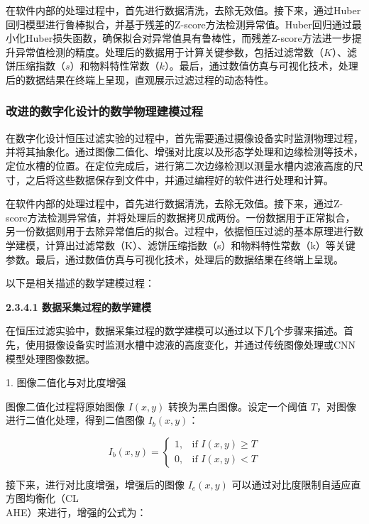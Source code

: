 \documentclass[UTF8,a4paper,fontset=none]{ctexart}
\newcommand{\wuhao}{\fontsize{10.5pt}{15pt}\selectfont}       %
\begin{document}
在软件内部的处理过程中，首先进行数据清洗，去除无效值。接下来，通过Huber回归模型进行鲁棒拟合，并基于残差的Z-score方法检测异常值。Huber回归通过最小化Huber损失函数，确保拟合对异常值具有鲁棒性，而残差Z-score方法进一步提升异常值检测的精度。处理后的数据用于计算关键参数，包括过滤常数（\(K\)）、滤饼压缩指数（\(s\)）和物料特性常数（\(k\)）。最后，通过数值仿真与可视化技术，处理后的数据结果在终端上呈现，直观展示过滤过程的动态特性。

\subsubsection{改进的数字化设计的数学物理建模过程}


在数字化设计恒压过滤实验的过程中，首先需要通过摄像设备实时监测物理过程，并将其抽象化。通过图像二值化、增强对比度以及形态学处理和边缘检测等技术，定位水槽的位置。在定位完成后，进行第二次边缘检测以测量水槽内滤液高度的尺寸，之后将这些数据保存到文件中，并通过编程好的软件进行处理和计算。

在软件内部的处理过程中，首先进行数据清洗，去除无效值。接下来，通过Z-score方法检测异常值，并将处理后的数据拷贝成两份。一份数据用于正常拟合，另一份数据则用于去除异常值后的拟合。过程中，依据恒压过滤的基本原理进行数学建模，计算出过滤常数（K）、滤饼压缩指数（s）和物料特性常数（k）等关键参数。最后，通过数值仿真与可视化技术，处理后的数据结果在终端上呈现。

以下是相关描述的数学建模过程：

{\noindent \wuhao \rmfamily {} \textbf{2.3.4.1 \quad 数据采集过程的数学建模}}

在恒压过滤实验中，数据采集过程的数学建模可以通过以下几个步骤来描述。首先，使用摄像设备实时监测水槽中滤液的高度变化，并通过传统图像处理或CNN模型处理图像数据。

1. 图像二值化与对比度增强

图像二值化过程将原始图像 \( I(x, y) \) 转换为黑白图像。设定一个阈值 \( T \)，对图像进行二值化处理，得到二值图像 \( I_b(x, y) \)：

\begin{equation}
I_b(x, y) = 
\begin{cases} 
1, & \text{if } I(x, y) \geq T \\
0, & \text{if } I(x, y) < T
\end{cases}
\end{equation}

接下来，进行对比度增强，增强后的图像 \( I_e(x, y) \) 可以通过对比度限制自适应直方图均衡化\textsuperscript{\cite{ref15,ref18}}（CL\\AHE）来进行，增强的公式为：
\end{document}
